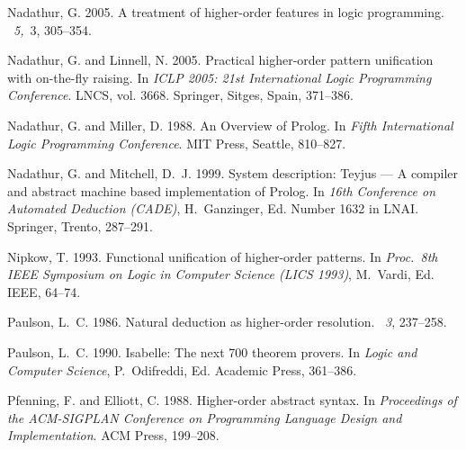 \documentclass{acmtrans2m}
\begin{document}
\begin{thebibliography}{}
{\sc Nadathur, G.} 2005.
\newblock A treatment of higher-order features in logic programming.
~{\em 5,\/}~3,
  305--354.

{\sc Nadathur, G.} {\sc and} {\sc Linnell, N.} 2005.
\newblock Practical higher-order pattern unification with on-the-fly raising.
\newblock In {\em {ICLP 2005: 21st International Logic Programming
  Conference}}. LNCS, vol. 3668. Springer, Sitges, Spain, 371--386.

{\sc Nadathur, G.} {\sc and} {\sc Miller, D.} 1988.
\newblock An {Overview} of {Prolog}.
\newblock In {\em {Fifth International Logic Programming Conference}}. MIT
  Press, Seattle, 810--827.

{\sc Nadathur, G.} {\sc and} {\sc Mitchell, D.~J.} 1999.
\newblock System description: {Teyjus} --- {A} compiler and abstract machine
  based implementation of {Prolog}.
\newblock In {\em 16th Conference on Automated Deduction (CADE)},
  {H.~Ganzinger}, Ed. Number 1632 in LNAI. Springer, Trento, 287--291.

{\sc Nipkow, T.} 1993.
\newblock Functional unification of higher-order patterns.
\newblock In {\em Proc.\ 8th {IEEE} Symposium on Logic in Computer Science
  ({LICS} 1993)}, {M.~Vardi}, Ed. IEEE, 64--74.

{\sc Paulson, L.~C.} 1986.
\newblock Natural deduction as higher-order resolution.
~{\em 3}, 237--258.

{\sc Paulson, L.~C.} 1990.
\newblock Isabelle: The next 700 theorem provers.
\newblock In {\em Logic and Computer Science}, {P.~Odifreddi}, Ed. Academic
  Press, 361--386.

{\sc Pfenning, F.} {\sc and} {\sc Elliott, C.} 1988.
\newblock Higher-order abstract syntax.
\newblock In {\em Proceedings of the {ACM}-{SIGPLAN} Conference on Programming
  Language Design and Implementation}. ACM Press, 199--208.


\end{thebibliography}
\end{document}
